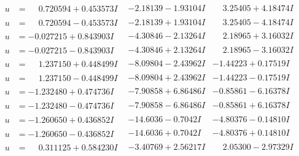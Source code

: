 \documentclass[1p]{elsarticle_modified}
\theoremstyle{definition}
\begin{document}
$$\begin{array}{c|c|c}
\begin{aligned}
u &= \phantom{-}0.720594 + 0.453573 I\end{aligned}
 & -2.18139 - 1.93104 I & \phantom{-}3.25405 + 4.18474 I \\ \hline\begin{aligned}
u &= \phantom{-}0.720594 - 0.453573 I\end{aligned}
 & -2.18139 + 1.93104 I & \phantom{-}3.25405 - 4.18474 I \\ \hline\begin{aligned}
u &= -0.027215 + 0.843903 I\end{aligned}
 & -4.30846 - 2.13264 I & \phantom{-}2.18965 + 3.16032 I \\ \hline\begin{aligned}
u &= -0.027215 - 0.843903 I\end{aligned}
 & -4.30846 + 2.13264 I & \phantom{-}2.18965 - 3.16032 I \\ \hline\begin{aligned}
u &= \phantom{-}1.237150 + 0.448499 I\end{aligned}
 & -8.09804 - 2.43962 I & -1.44223 + 0.17519 I \\ \hline\begin{aligned}
u &= \phantom{-}1.237150 - 0.448499 I\end{aligned}
 & -8.09804 + 2.43962 I & -1.44223 - 0.17519 I \\ \hline\begin{aligned}
u &= -1.232480 + 0.474736 I\end{aligned}
 & -7.90858 + 6.86486 I & -0.85861 - 6.16378 I \\ \hline\begin{aligned}
u &= -1.232480 - 0.474736 I\end{aligned}
 & -7.90858 - 6.86486 I & -0.85861 + 6.16378 I \\ \hline\begin{aligned}
u &= -1.260650 + 0.436852 I\end{aligned}
 & -14.6036 - 0.7042 I & -4.80376 - 0.14810 I \\ \hline\begin{aligned}
u &= -1.260650 - 0.436852 I\end{aligned}
 & -14.6036 + 0.7042 I & -4.80376 + 0.14810 I \\ \hline\begin{aligned}
u &= \phantom{-}0.311125 + 0.584230 I\end{aligned}
 & -3.40769 + 2.56217 I & \phantom{-}2.05300 - 2.97329 I \\ \hline\begin{aligned}

\end{aligned}
\end{array}$$
\end{document}
